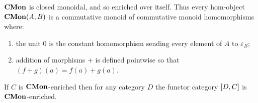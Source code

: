 $\mathbf{CMon}$ is closed monoidal, and so enriched over itself. Thus every hom-object $\mathbf{CMon}(A,B)$ is a commutative
monoid of commutative monoid homomorphisms where:
\begin{enumerate}
\item the unit $0$ is the constant homomorphism sending every element of $A$ to $\varepsilon_B$;
\item addition of morphisms $+$ is defined pointwise so that $(f + g)(a) = f(a) + g(a)$.
\end{enumerate}

\begin{proposition}
If $C$ is $\mathbf{CMon}$-enriched then for any category $D$ the functor category $[D,C]$ is $\mathbf{CMon}$-enriched.
\end{proposition}

